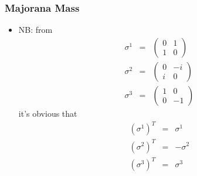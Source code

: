 \documentclass{beamer}
\begin{document}
 









 
\begin{frame}
	\frametitle{Majorana Mass}
		\begin{itemize}
		\item NB: from
\[
\begin{aligned}\sigma^{1} & = & \left(\begin{array}{cc}
0 & 1\\
1 & 0
\end{array}\right)\\
\sigma^{2} & = & \left(\begin{array}{cc}
0 & -i\\
i & 0
\end{array}\right)\\
\sigma^{3} & = & \left(\begin{array}{cc}
1 & 0\\
0 & -1
\end{array}\right)
\end{aligned}
\]
\pause
it's obvious that
\pause
\[
\begin{alignedat}{2}\left(\sigma^{1}\right)^{T} & = & \sigma^{1}\\
\left(\sigma^{2}\right)^{T} & = & -\sigma^{2}\\
\left(\sigma^{3}\right)^{T} & = & \sigma^{3}
\end{alignedat}
\]

	\end{itemize}
\end{frame}

 
\end{document}
